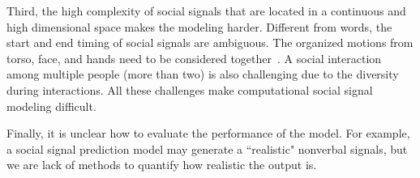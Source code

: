 Third, the high complexity of social signals that are located in a continuous and high dimensional space makes the modeling harder. Different from words, the start and end timing of social signals are ambiguous. The organized motions from torso, face, and hands need to be considered together~\cite{aviezer2008angry,barrett2011context}. A social interaction among multiple people (more than two) is also challenging due to the diversity during interactions. All these challenges make computational social signal modeling difficult.

Finally, it is unclear how to evaluate the performance of the model. For example, a social signal prediction model may generate a ``realistic" nonverbal signals, but we are lack of methods to quantify how realistic the output is.


